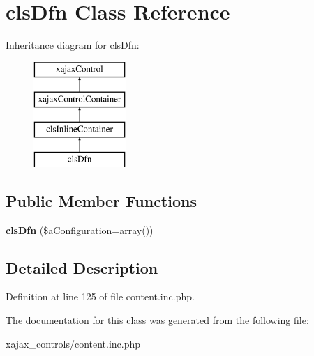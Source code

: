 \hypertarget{classclsDfn}{
\section{clsDfn Class Reference}
\label{classclsDfn}
}
Inheritance diagram for clsDfn:\begin{figure}[H]
\begin{center}
\leavevmode
\includegraphics[height=4.000000cm]{classclsDfn}
\end{center}
\end{figure}
\subsection*{Public Member Functions}
\begin{DoxyCompactItemize}
\item 
\hypertarget{classclsDfn_af845eb0a3ed2bc0da59cdc1b02692001}{
{\bfseries clsDfn} (\$aConfiguration=array())}
\label{classclsDfn_af845eb0a3ed2bc0da59cdc1b02692001}

\end{DoxyCompactItemize}


\subsection{Detailed Description}


Definition at line 125 of file content.inc.php.



The documentation for this class was generated from the following file:\begin{DoxyCompactItemize}
\item 
xajax\_\-controls/content.inc.php\end{DoxyCompactItemize}
